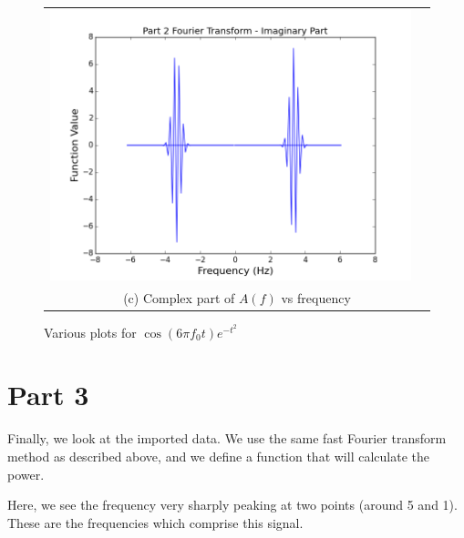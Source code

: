 \documentclass[11pt]{article}
\begin{document}
\begin{figure}[H]
\begin{tabular}{cc}
\includegraphics[scale=.4]{prt2_fourComp.png}\\
\multicolumn{2}{c}{(c) Complex part of $A(f)$ vs frequency} \\[6pt]
\end{tabular}
\caption{Various plots for $\cos (6\pi f_0 t) e^{-t^2} $}
\end{figure}

\section{Part 3}

Finally, we look at the imported data. We use the same fast Fourier transform method as described above, and we define a function that will calculate the power. 

Here, we see the frequency very sharply peaking at two points (around 5 and 1). These are the frequencies which comprise this signal. 
\end{document}
